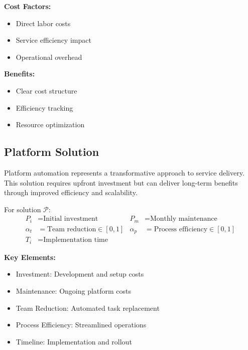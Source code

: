 \documentclass[12pt,a4paper]{article}
\newenvironment{definition}[1]
{\begin{mdframed}[style=definitionstyle,frametitle={Definition: #1}]}
{\end{mdframed}}
\newenvironment{explanation}
{\begin{mdframed}[style=explanationstyle,frametitle={Explanation}]}
{\end{mdframed}}
\begin{document}
\begin{explanation}
\textbf{Cost Factors:}
\begin{itemize}
    \item Direct labor costs
    \item Service efficiency impact
    \item Operational overhead
\end{itemize}
\textbf{Benefits:}
\begin{itemize}
    \item Clear cost structure
    \item Efficiency tracking
    \item Resource optimization
\end{itemize}
\end{explanation}

\subsection{Platform Solution}
Platform automation represents a transformative approach to service delivery. This solution requires upfront investment but can deliver long-term benefits through improved efficiency and scalability.

\begin{definition}{Platform Variables}
For solution $\mathcal{P}$:
\begin{align*}
    P_i &= \text{Initial investment} & P_m &= \text{Monthly maintenance} \\
    \alpha_t &= \text{Team reduction} \in [0,1] & \alpha_p &= \text{Process efficiency} \in [0,1] \\
    T_i &= \text{Implementation time} & &
\end{align*}
\end{definition}

\begin{explanation}
\textbf{Key Elements:}
\begin{itemize}
    \item Investment: Development and setup costs
    \item Maintenance: Ongoing platform costs
    \item Team Reduction: Automated task replacement
    \item Process Efficiency: Streamlined operations
    \item Timeline: Implementation and rollout
\end{itemize}
\end{explanation}
\end{document}

